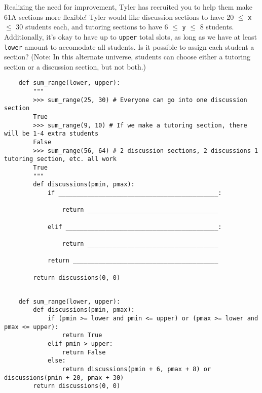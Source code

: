 \begin{blocksection}
    \question Realizing the need for improvement, Tyler has recruited you to help them make 61A sections more flexible! 
    Tyler would like discussion sections to have 20 $\leq$ \lstinline$x$ $\leq$ 30 students each, 
    and tutoring sections to have 6 $\leq$ \lstinline$y$ $\leq$ 8 students. 
    Additionally, it's okay to have up to \lstinline$upper$ total slots, as long as we have at least \lstinline$lower$ amount to accomodate all students.
    Is it possible to assign each student a section? (Note: In this alternate universe, students can choose either
    a tutoring section or a discussion section, but not both.)
    
    \begin{lstlisting}
    def sum_range(lower, upper):
        """
        >>> sum_range(25, 30) # Everyone can go into one discussion section
        True
        >>> sum_range(9, 10) # If we make a tutoring section, there will be 1-4 extra students
        False
        >>> sum_range(56, 64) # 2 discussion sections, 2 discussions 1 tutoring section, etc. all work
        True
        """
        def discussions(pmin, pmax):
            if ____________________________________________:
    
                return ____________________________________
    
            elif __________________________________________:
    
                return ____________________________________
    
            return ________________________________________
    
        return discussions(0, 0)
    
    \end{lstlisting}
    \end{blocksection}
    
    \begin{solution}[1.5in]
    \begin{blocksection}
    \begin{lstlisting}
    def sum_range(lower, upper):
        def discussions(pmin, pmax):
            if (pmin >= lower and pmin <= upper) or (pmax >= lower and pmax <= upper):
                return True
            elif pmin > upper:
                return False
            else:
                return discussions(pmin + 6, pmax + 8) or discussions(pmin + 20, pmax + 30)
        return discussions(0, 0)
    \end{lstlisting}
    
    \end{blocksection}
    \end{solution}
    
